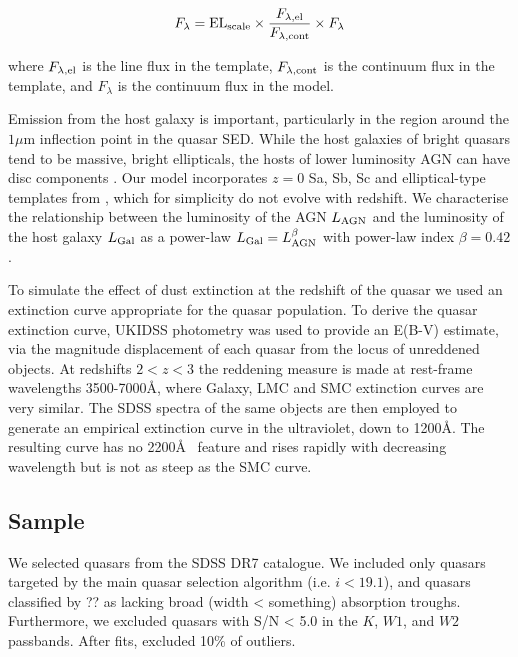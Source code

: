 \begin{eqnarray}
  F_{\lambda} =  {\rm EL}_{\rm scale} \times \frac{F_{\lambda, \rm el}}{F_{\lambda, \rm cont}} \times F_{\lambda} 
\end{eqnarray} 

where $F_{\lambda, \rm el}$ is the line flux in the template, $F_{\lambda,\rm cont}$ is the continuum flux in the template, and $F_{\lambda}$ is the continuum flux in the model.  

Emission from the host galaxy is important, particularly in the region around the $1\mu$m inflection point in the quasar SED. While the host galaxies of bright quasars tend to be massive, bright ellipticals, the hosts of lower luminosity AGN can have disc components \citep[e.g.][]{dunlop03}. Our model incorporates $z=0$ Sa, Sb, Sc and elliptical-type templates from \citet{mannucci01}, which for simplicity do not evolve with redshift. We characterise the relationship between the luminosity of the AGN $L_{\rm AGN}$ and the luminosity of the host galaxy $L_{\rm Gal}$ as a power-law $L_{\rm Gal} = L_{\rm AGN}^{\beta}$ with power-law index $\beta=0.42$ \citep{maddox06}.

To simulate the effect of dust extinction at the redshift of the quasar we used an extinction curve appropriate for the quasar population. To derive the quasar extinction curve, UKIDSS photometry was used to provide an E(B-V) estimate, via the magnitude displacement of each quasar from the locus of unreddened objects. At redshifts $2 < z < 3$ the reddening measure is made at rest-frame wavelengths 3500-7000\AA, where Galaxy, LMC and SMC extinction curves are very similar. The SDSS spectra of the same objects are then employed to generate an empirical extinction curve in the ultraviolet, down to 1200\AA. The resulting curve has no 2200\AA~ feature and rises rapidly with decreasing wavelength but is not as steep as the SMC curve. 

\subsection{Sample}

We selected quasars from the SDSS DR7 catalogue. We included only quasars targeted by the main quasar selection algorithm (i.e. $i < 19.1$), and quasars classified by ?? as lacking broad (width < something) absorption troughs. Furthermore, we excluded quasars with S/N < 5.0 in the $K$, $W1$, and $W2$ passbands. After fits, excluded 10\% of outliers. 

